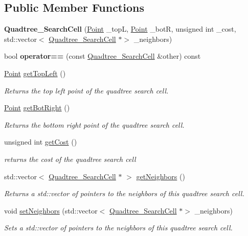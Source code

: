 \subsection*{Public Member Functions}
\begin{DoxyCompactItemize}
\item 
\mbox{\label{classQuadtree__SearchCell_aae69ecac827985bc95c5d93736a874bf}} 
{\bfseries Quadtree\+\_\+\+Search\+Cell} (\hyperlink{structPoint}{Point} \+\_\+topL, \hyperlink{structPoint}{Point} \+\_\+botR, unsigned int \+\_\+cost, std\+::vector$<$ \hyperlink{classQuadtree__SearchCell}{Quadtree\+\_\+\+Search\+Cell} $\ast$$>$ \+\_\+neighbors)
\item 
\mbox{\label{classQuadtree__SearchCell_ad19965518209ded935963af6f82439b0}} 
bool {\bfseries operator==} (const \hyperlink{classQuadtree__SearchCell}{Quadtree\+\_\+\+Search\+Cell} \&other) const
\item 
\hyperlink{structPoint}{Point} \hyperlink{classQuadtree__SearchCell_a757563b6c0b2c46ab3470225fc3d9026}{get\+Top\+Left} ()
\begin{DoxyCompactList}\small\item\em Returns the top left point of the quadtree search cell. \end{DoxyCompactList}\item 
\hyperlink{structPoint}{Point} \hyperlink{classQuadtree__SearchCell_aa05145ed327cd4043027ea7d0dc05006}{get\+Bot\+Right} ()
\begin{DoxyCompactList}\small\item\em Returns the bottom right point of the quadtree search cell. \end{DoxyCompactList}\item 
unsigned int \hyperlink{classQuadtree__SearchCell_af5398942f7a48fc146ec99f798aedc71}{get\+Cost} ()
\begin{DoxyCompactList}\small\item\em returns the cost of the quadtree search cell \end{DoxyCompactList}\item 
std\+::vector$<$ \hyperlink{classQuadtree__SearchCell}{Quadtree\+\_\+\+Search\+Cell} $\ast$ $>$ \hyperlink{classQuadtree__SearchCell_a8af6b597f8a32c7c19f858f34d16efa2}{get\+Neighbors} ()
\begin{DoxyCompactList}\small\item\em Returns a std\+::vector of pointers to the neighbors of this quadtree search cell. \end{DoxyCompactList}\item 
void \hyperlink{classQuadtree__SearchCell_a36c9e92db030bb40f563d0c3b0453c8b}{set\+Neighbors} (std\+::vector$<$ \hyperlink{classQuadtree__SearchCell}{Quadtree\+\_\+\+Search\+Cell} $\ast$$>$ \+\_\+neighbors)
\begin{DoxyCompactList}\small\item\em Sets a std\+::vector of pointers to the neighbors of this quadtree search cell. \end{DoxyCompactList}\end{DoxyCompactItemize}
